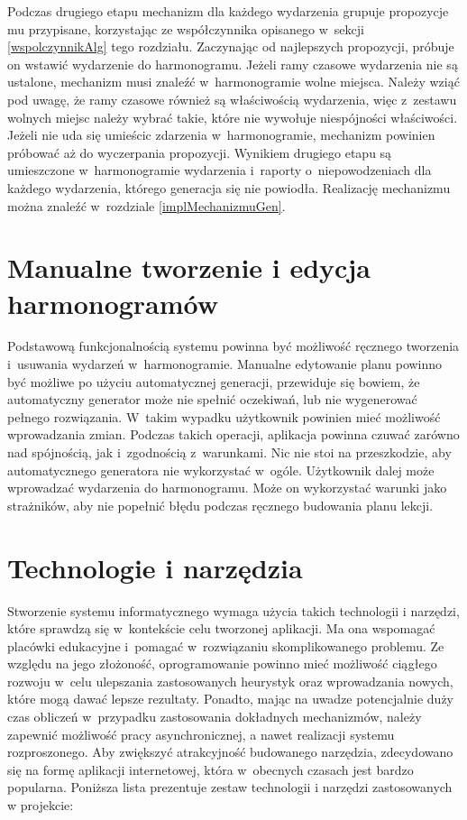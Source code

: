 \documentclass[a4paper]{book}
\begin{document}
Podczas drugiego etapu mechanizm dla każdego wydarzenia grupuje propozycje mu przypisane, korzystając ze współczynnika opisanego w~sekcji \ref{wspolczynnikAlg} tego rozdziału. Zaczynając od najlepszych propozycji, próbuje on wstawić wydarzenie do harmonogramu. Jeżeli ramy czasowe wydarzenia nie są ustalone, mechanizm musi znaleźć w~harmonogramie wolne miejsca. Należy wziąć pod uwagę, że ramy czasowe również są właściwością wydarzenia, więc z~zestawu wolnych miejsc należy wybrać takie, które nie wywołuje niespójności właściwości. Jeżeli nie uda się umieścic zdarzenia w~harmonogramie, mechanizm powinien próbować aż do wyczerpania propozycji. Wynikiem drugiego etapu są umieszczone w~harmonogramie wydarzenia i~raporty o~niepowodzeniach dla każdego wydarzenia, którego generacja się nie powiodła. Realizację mechanizmu można znaleźć w~rozdziale \ref{implMechanizmuGen}.

\section{Manualne tworzenie i edycja harmonogramów}
Podstawową funkcjonalnością systemu powinna być możliwość ręcznego tworzenia i~usuwania wydarzeń w~harmonogramie. Manualne edytowanie planu powinno być możliwe po użyciu automatycznej generacji, przewiduje się bowiem, że automatyczny generator może nie spełnić oczekiwań, lub nie wygenerować pełnego rozwiązania. W~takim wypadku użytkownik powinien mieć możliwość wprowadzania zmian. Podczas takich operacji, aplikacja powinna czuwać zarówno nad spójnością, jak i~zgodnością z~warunkami. Nic nie stoi na przeszkodzie, aby automatycznego generatora nie wykorzystać w~ogóle. Użytkownik dalej może wprowadzać wydarzenia do harmonogramu. Może on wykorzystać warunki jako strażników, aby nie popełnić błędu podczas ręcznego budowania planu lekcji. 

\section{Technologie i narzędzia}
Stworzenie systemu informatycznego wymaga użycia takich technologii i narzędzi, które sprawdzą się w~kontekście celu tworzonej aplikacji. Ma ona wspomagać placówki edukacyjne i~pomagać w~rozwiązaniu skomplikowanego problemu. Ze względu na jego złożoność, oprogramowanie powinno mieć możliwość ciągłego rozwoju w~celu ulepszania zastosowanych heurystyk oraz wprowadzania nowych, które mogą dawać lepsze rezultaty. Ponadto, mając na uwadze potencjalnie duży czas obliczeń w~przypadku zastosowania dokładnych mechanizmów, należy zapewnić możliwość pracy asynchronicznej, a nawet realizacji systemu rozproszonego. Aby zwiększyć atrakcyjność budowanego narzędzia, zdecydowano się na formę aplikacji internetowej, która w~obecnych czasach jest bardzo popularna. Poniższa lista prezentuje zestaw technologii i narzędzi zastosowanych w projekcie:
\end{document}
